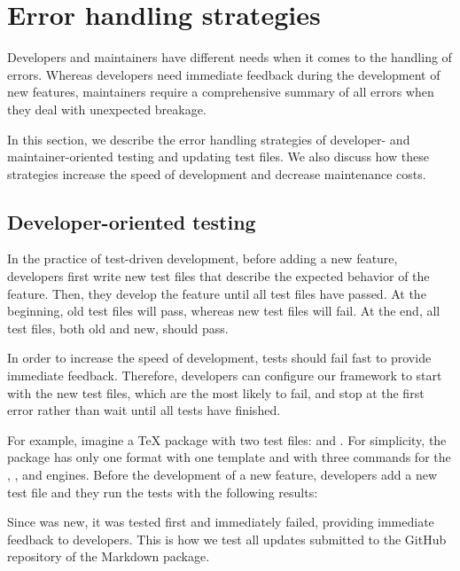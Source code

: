 \documentclass[final]{ltugboat}
\begin{document}
\section{Error handling strategies}
\label{sec:error-handling-strategies}

Developers and maintainers have different needs when it comes to the handling of errors. Whereas developers need immediate feedback during the development of new features, maintainers require a comprehensive summary of all errors when they deal with unexpected breakage.

In this section, we describe the error handling strategies of developer- and maintainer-oriented testing and updating test files. We also discuss how these strategies increase the speed of development and decrease maintenance costs.

\subsection{Developer-oriented testing}

In the practice of test-driven development, before adding a new feature, developers first write new test files that describe the expected behavior of the feature. Then, they develop the feature until all test files have passed. At the beginning, old test files will pass, whereas new test files will fail. At the end, all test files, both old and new, should pass.

In order to increase the speed of development, tests should fail fast to provide immediate feedback. Therefore, developers can configure our framework to start with the new test files, which are the most likely to fail, and stop at the first error rather than wait until all tests have finished.

For example, imagine a \TeX{} package with two test files:  and . For simplicity, the package has only one format with one template and with three commands for the , , and  engines. Before the development of a new feature, developers add a new test file  and they run the tests with the following results:

\smallskip
\noindent
\begingroup
\centering

\par
\endgroup

\smallskip
\noindent
Since  was new, it was tested first and immediately failed, providing immediate feedback to developers. This is how we test all updates submitted to the GitHub repository of the Markdown package.
\end{document}

